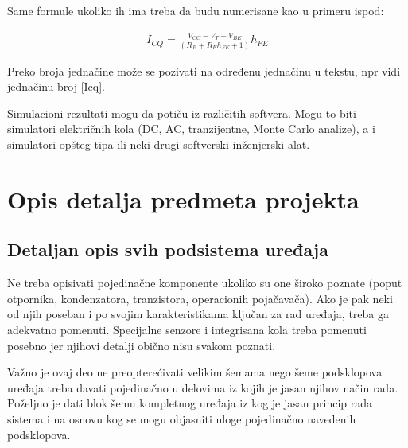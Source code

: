 \documentclass[a4paper, 12pt]{article}
\begin{document}
\vspace{10pt}

Same formule ukoliko ih ima treba da budu numerisane kao u primeru ispod:

\begin{align}
I_{CQ}= \frac{ V_{CC}-V_T-V_{BE} }{ \left(R_B+R_E h_{FE}+1 \right) }h_{FE}  \label{Icq}
\end{align}

\vspace{10pt}

Preko broja jednačine može se pozivati na određenu jednačinu u tekstu, npr vidi jednačinu broj \ref{Icq}.

\vspace{10pt}

Simulacioni rezultati mogu da potiču iz različitih softvera. Mogu to biti simulatori električnih kola (DC, AC, tranzijentne, Monte Carlo analize), a i simulatori opšteg tipa ili neki drugi softverski inženjerski alat.

\pagebreak

\section{Opis detalja predmeta projekta}

\vspace{10pt}
	
	\subsection{Detaljan opis svih podsistema uređaja}

\vspace{10pt}
	
	Ne treba opisivati pojedinačne komponente ukoliko su one široko poznate (poput otpornika, kondenzatora, tranzistora, operacionih pojačavača). Ako je pak neki od njih poseban i po svojim karakteristikama ključan za rad uređaja, treba ga adekvatno pomenuti. Specijalne senzore i integrisana kola treba pomenuti posebno jer njihovi detalji obično nisu svakom poznati.

\vspace{10pt}

Važno je ovaj deo ne preopterećivati velikim šemama nego šeme podsklopova uređaja treba davati pojedinačno u delovima iz kojih je jasan njihov način rada. Poželjno je dati blok šemu kompletnog uređaja iz kog je jasan princip rada sistema i na osnovu kog se mogu objasniti uloge pojedinačno navedenih podsklopova.
\end{document}
